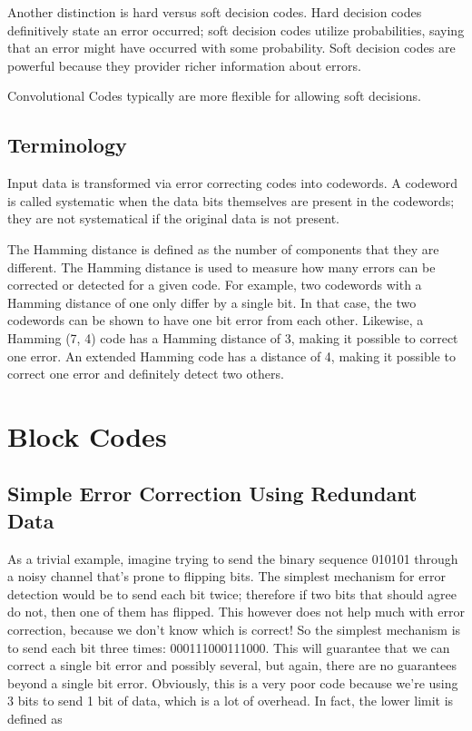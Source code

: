 \documentclass[12pt]{article}
\begin{document}
Another distinction is hard versus soft decision codes. Hard decision codes definitively state an error occurred; soft decision codes utilize probabilities, saying that an error might have occurred with some probability. Soft decision codes are powerful because they provider richer information about errors. \cite{tanenbaum} 

Convolutional Codes typically are more flexible for allowing soft decisions. \cite{mitvit}

\subsection{Terminology}

Input data is transformed via error correcting codes into codewords. A codeword is called systematic when the data bits themselves are present in the codewords; they are not systematical if the original data is not present. 

The Hamming distance is defined as the number of components that they are different. The Hamming distance is used to measure how many errors can be corrected or detected for a given code. For example, two codewords with a Hamming distance of one only differ by a single bit. In that case, the two codewords can be shown to have one bit error from each other. Likewise, a Hamming (7, 4) code has a Hamming distance of 3, making it possible to correct one error. An extended Hamming code has a distance of 4, making it possible to correct one error and definitely detect two others. \cite{sphere}

\section{Block Codes}

\subsection{Simple Error Correction Using Redundant Data}

As a trivial example, imagine trying to send the binary sequence 010101 through a noisy channel that's prone to flipping bits. The simplest mechanism for error detection would be to send each bit twice; therefore if two bits that should agree do not, then one of them has flipped. This however does not help much with error correction, because we don't know which is correct! So the simplest mechanism is to send each bit three times: 000111000111000. This will guarantee that we can correct a single bit error and possibly several, but again, there are no guarantees beyond a single bit error. Obviously, this is a very poor code because we're using 3 bits to send 1 bit of data, which is a lot of overhead. In fact, the lower limit is defined as 
\end{document}
